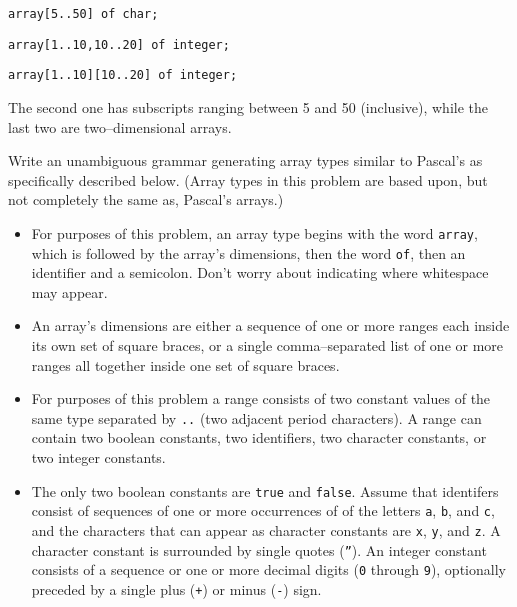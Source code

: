 \documentclass[11pt]{article}
\begin{document}
\begin{enumerate}
\begin{multicols}{2}
            \texttt{array[5..50] of char;}

            \texttt{array[1..10,10..20] of integer;}

            \texttt{array[1..10][10..20] of integer;}

          \end{multicols}

          \vspace{-2.75mm}

          The second one has subscripts ranging between 5 and 50
          (inclusive), while the last two are two--dimensional arrays.

          Write an unambiguous grammar generating array types similar to
          Pascal's as specifically described below.  (Array types in this
          problem are based upon, but not completely the same as, Pascal's
          arrays.)

          \vspace{-1.75mm}

          \begin{itemize}

            \addtolength{\itemsep}{.25mm}

            \item For purposes of this problem, an array type begins with
                  the word \texttt{array}, which is followed by the array's
                  dimensions, then the word \texttt{of}, then an identifier
                  and a semicolon.  Don't worry about indicating where
                  whitespace may appear.

            \item An array's dimensions are either a sequence of one or more
                  ranges each inside its own set of square braces, or a
                  single comma--separated list of one or more ranges all
                  together inside one set of square braces.

            \item For purposes of this problem a range consists of two
                  constant values of the same type separated by \texttt{..}
                  (two adjacent period characters).  A range can contain two
                  boolean constants, two identifiers, two character
                  constants, or two integer constants.

            \item The only two boolean constants are \texttt{true} and
                  \texttt{false}.  Assume that identifers consist of
                  sequences of one or more occurrences of of the letters
                  \texttt{a}, \texttt{b}, and \texttt{c}, and the characters
                  that can appear as character constants are \texttt{x},
                  \texttt{y}, and \texttt{z}.  A character constant is
                  surrounded by single quotes (\texttt{''}).  An integer
                  constant consists of a sequence or one or more decimal
                  digits (\texttt{0} through \texttt{9}), optionally
                  preceded by a single plus (\texttt{+}) or minus
                  (\texttt{-}) sign.


\end{itemize}
\end{enumerate}
\end{document}
